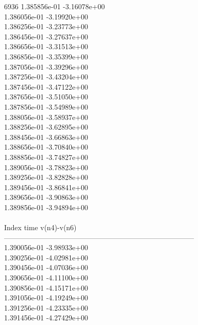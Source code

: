 6936	1.385856e-01	-3.16078e+00	\\ 	1.386056e-01	-3.19920e+00	\\ 	1.386256e-01	-3.23773e+00	\\ 	1.386456e-01	-3.27637e+00	\\ 	1.386656e-01	-3.31513e+00	\\ 	1.386856e-01	-3.35399e+00	\\ 	1.387056e-01	-3.39296e+00	\\ 	1.387256e-01	-3.43204e+00	\\ 	1.387456e-01	-3.47122e+00	\\ 	1.387656e-01	-3.51050e+00	\\ 	1.387856e-01	-3.54989e+00	\\ 	1.388056e-01	-3.58937e+00	\\ 	1.388256e-01	-3.62895e+00	\\ 	1.388456e-01	-3.66863e+00	\\ 	1.388656e-01	-3.70840e+00	\\ 	1.388856e-01	-3.74827e+00	\\ 	1.389056e-01	-3.78823e+00	\\ 	1.389256e-01	-3.82828e+00	\\ 	1.389456e-01	-3.86841e+00	\\ 	1.389656e-01	-3.90863e+00	\\ 	1.389856e-01	-3.94894e+00	\\ \hline
\\ \hline
Index   time            v(n4)-v(n6)     \\ \hline
--------------------------------------------------------------------------------\\ 	1.390056e-01	-3.98933e+00	\\ 	1.390256e-01	-4.02981e+00	\\ 	1.390456e-01	-4.07036e+00	\\ 	1.390656e-01	-4.11100e+00	\\ 	1.390856e-01	-4.15171e+00	\\ 	1.391056e-01	-4.19249e+00	\\ 	1.391256e-01	-4.23335e+00	\\ 	1.391456e-01	-4.27429e+00	\\ \hline
